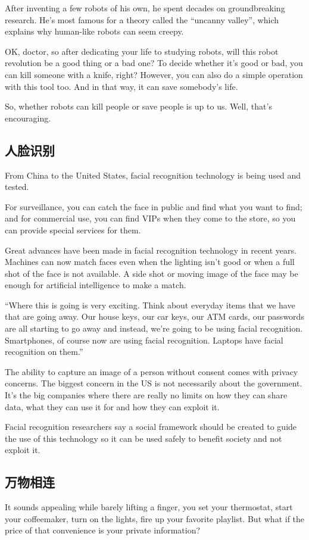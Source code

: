After inventing a few robots of his own, he spent decades on groundbreaking research. He's most famous for a theory called the “uncanny valley”, which explains why human-like robots can seem creepy.

OK, doctor, so after dedicating your life to studying robots, will this robot revolution be a good thing or a bad one?
To decide whether it's good or bad, you can kill someone with a knife, right? However, you can also do a simple operation with this tool too. And in that way, it can save somebody's life.

So, whether robots can kill people or save people is up to us. Well, that's encouraging.
\subsection{人脸识别}
From China to the United States, facial recognition technology is being used and tested.

For surveillance, you can catch the face in public and find what you want to find; and for commercial use, you can find VIPs when they come to the store, so you can provide special services for them.

Great advances have been made in facial recognition technology in recent years.
Machines can now match faces even when the lighting isn't good or when a full shot of the face is not available. A side shot or moving image of the face may be enough for artificial intelligence to make a match.

“Where this is going is very exciting. Think about everyday items that we have that are going away. Our house keys, our car keys, our ATM cards, our passwords are all starting to go away and instead, we're going to be using facial recognition. Smartphones, of course now are using facial recognition. Laptops have facial recognition on them.”

The ability to capture an image of a person without consent comes with privacy concerns.
The biggest concern in the US is not necessarily about the government. It's the big companies where there are really no limits on how they can share data, what they can use it for and how they can exploit it.

Facial recognition researchers say a social framework should be created to guide the use of this technology so it can be used safely to benefit society and not exploit it.


\subsection{万物相连}
It sounds appealing while barely lifting a finger, you set your thermostat, start your coffeemaker, turn on the lights, fire up your favorite playlist. But what if the price of that convenience is your private information?


